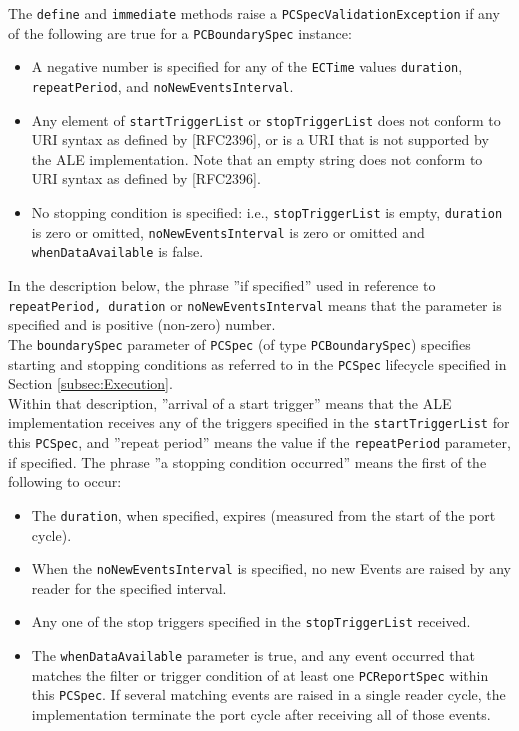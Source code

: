 \documentclass[11pt,a4paper,oneside]{article}
\begin{document}
The \texttt{define} and \texttt{immediate} methods raise a \texttt{PCSpecValidationException} if any of the following are true for a \texttt{PCBoundarySpec} instance:
\begin{itemize}
\item	A negative number is specified for any of the \texttt{ECTime} values \texttt{duration},\ifpdf\\\fi
\texttt{repeatPeriod}, and \texttt{noNewEventsInterval}.
\item	Any element of \texttt{startTriggerList} or \texttt{stopTriggerList} does not conform to URI syntax as defined by   [RFC2396], or is a URI that is not supported by the ALE implementation. Note that an empty string does not conform to URI syntax as defined by [RFC2396].
\item	No stopping condition is specified: i.e., \texttt{stopTriggerList} is empty, \texttt{duration} is zero or omitted, \texttt{noNewEventsInterval} is zero or omitted and \texttt{whenDataAvailable} is false.
\end{itemize}
In the description below, the phrase ''if specified'' used in reference to \texttt{repeatPeriod, duration} or \texttt{noNewEventsInterval} means that the parameter is specified and is positive (non-zero) number.\\
The \texttt{boundarySpec} parameter of \texttt{PCSpec} (of type \texttt{PCBoundarySpec}) specifies starting and stopping conditions as referred to in the \texttt{PCSpec} lifecycle specified in Section \ref{subsec:Execution}.\\ Within that description, ''arrival of a start trigger'' means that the ALE implementation receives any of the triggers specified in the \texttt{startTriggerList} for this \texttt{PCSpec}, and ''repeat period'' means the value if the \texttt{repeatPeriod} parameter, if specified. The phrase ''a stopping condition occurred'' means the first of the following to occur:

\begin{itemize}
\item	The \texttt{duration}, when specified, expires (measured from the start of the port cycle).
\item	When the \texttt{noNewEventsInterval} is specified, no new Events are raised by any reader for the specified interval.
\item	Any one of the stop triggers specified in the \texttt{stopTriggerList} received.
\item	The \texttt{whenDataAvailable} parameter is true, and any event occurred that matches the filter or trigger condition of at least one \texttt{PCReportSpec} within this \texttt{PCSpec}. If several matching events are raised in a single reader cycle, the implementation terminate the port cycle after receiving all of those events.
\end {itemize}
\end{document}
